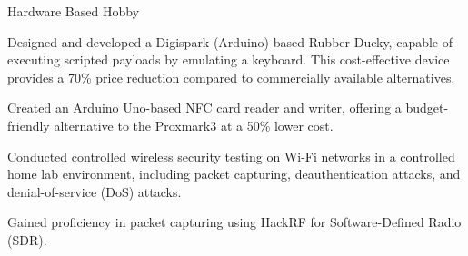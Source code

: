 
\begin{cventries}

  \cventry
    {Hardware Based} %
    {Hobby} %
    {} %
    {}
    {
      \begin{cvitems} %
        \item {Designed and developed a Digispark (Arduino)-based Rubber Ducky, capable of executing scripted payloads by emulating a keyboard. This cost-effective device provides a 70\% price reduction compared to commercially available alternatives.}
        \item {Created an Arduino Uno-based NFC card reader and writer, offering a budget-friendly alternative to the Proxmark3 at a 50\% lower cost.}
        \item {Conducted controlled wireless security testing on Wi-Fi networks in a controlled home lab environment, including packet capturing, deauthentication attacks, and denial-of-service (DoS) attacks.}
        \item {Gained proficiency in packet capturing using HackRF for Software-Defined Radio (SDR).}
      \end{cvitems}
    }



\end{cventries}
